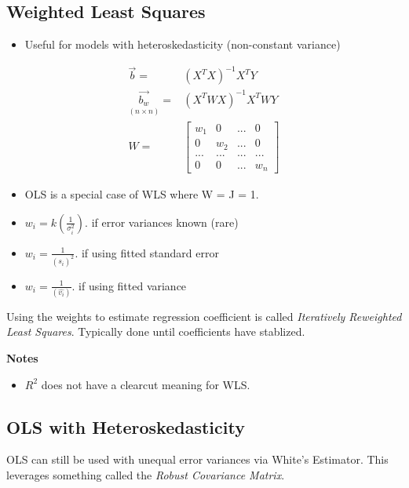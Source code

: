 \documentclass[11pt]{article}
\begin{document}
\subsection{Weighted Least Squares}
\label{sec:orgb47bf86}
\begin{itemize}
\item Useful for models with heteroskedasticity (non-constant variance)
\end{itemize}

\begin{equation}
\begin{split}
\vec{b} = & (X^T X)^{-1} X^T Y\\
\underset{(n \times n)}{\vec{b_w}} = & (X^T W X)^{-1} X^T W Y\\
W = & \begin{bmatrix}
w_1 & 0 & ... & 0\\
0 & w_2 & ... & 0\\
... & ... & ... & ...\\
0 & 0 & ... & w_n
\end{bmatrix}
\end{split}
\end{equation}

\begin{itemize}
\item OLS is a special case of WLS where W = J = 1.

\item \(w_i = k(\frac{1}{\sigma_i^2})\). if error variances known (rare)
\item \(w_i = \frac{1}{(\hat{s_i})^2}\). if using fitted standard error
\item \(w_i = \frac{1}{(\hat{v_i})}\). if using fitted variance
\end{itemize}

Using the weights to estimate regression coefficient is called
\emph{Iteratively Reweighted Least Squares}. Typically done until coefficients have
stablized.

\textbf{Notes}
\begin{itemize}
\item \(R^2\) does not have a clearcut meaning for WLS.
\end{itemize}
\subsection{OLS with Heteroskedasticity}
\label{sec:orgf3878fd}
OLS can still be used with unequal error variances via White's Estimator. This
leverages something called the \emph{Robust Covariance Matrix}.
\end{document}
